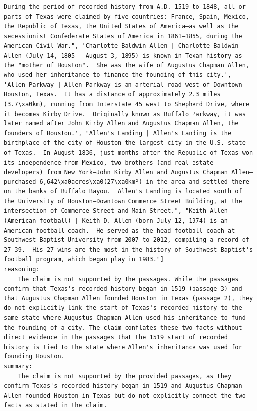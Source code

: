\begin{instructbox}
\begin{lstlisting}[breakindent=0pt, breaklines=true, breakatwhitespace=true, frame=single, backgroundcolor=\color{green!10}]
    During the period of recorded history from A.D. 1519 to 1848, all or parts of Texas were claimed by five countries: France, Spain, Mexico, the Republic of Texas, the United States of America—as well as the secessionist Confederate States of America in 1861–1865, during the American Civil War.", 'Charlotte Baldwin Allen | Charlotte Baldwin Allen (July 14, 1805 – August 3, 1895) is known in Texan history as the "mother of Houston".  She was the wife of Augustus Chapman Allen, who used her inheritance to finance the founding of this city.', 'Allen Parkway | Allen Parkway is an arterial road west of Downtown Houston, Texas.  It has a distance of approximately 2.3 miles (3.7\xa0km), running from Interstate 45 west to Shepherd Drive, where it becomes Kirby Drive.  Originally known as Buffalo Parkway, it was later named after John Kirby Allen and Augustus Chapman Allen, the founders of Houston.', "Allen's Landing | Allen's Landing is the birthplace of the city of Houston—the largest city in the U.S. state of Texas.  In August 1836, just months after the Republic of Texas won its independence from Mexico, two brothers (and real estate developers) from New York—John Kirby Allen and Augustus Chapman Allen—purchased 6,642\xa0acres\xa0(27\xa0km²) in the area and settled there on the banks of Buffalo Bayou.  Allen's Landing is located south of the University of Houston–Downtown Commerce Street Building, at the intersection of Commerce Street and Main Street.", "Keith Allen (American football) | Keith D. Allen (born July 12, 1974) is an American football coach.  He served as the head football coach at Southwest Baptist University from 2007 to 2012, compiling a record of 27–39.  His 27 wins are the most in the history of Southwest Baptist's football program, which began play in 1983."]
reasoning:
    The claim is not supported by the passages. While the passages confirm that Texas's recorded history began in 1519 (passage 3) and that Augustus Chapman Allen founded Houston in Texas (passage 2), they do not explicitly link the start of Texas's recorded history to the same state where Augustus Chapman Allen used his inheritance to fund the founding of a city. The claim conflates these two facts without direct evidence in the passages that the 1519 start of recorded history is tied to the state where Allen's inheritance was used for founding Houston.
summary:
    The claim is not supported by the provided passages, as they confirm Texas's recorded history began in 1519 and Augustus Chapman Allen founded Houston in Texas but do not explicitly connect the two facts as stated in the claim.



\end{lstlisting}
\end{instructbox}
